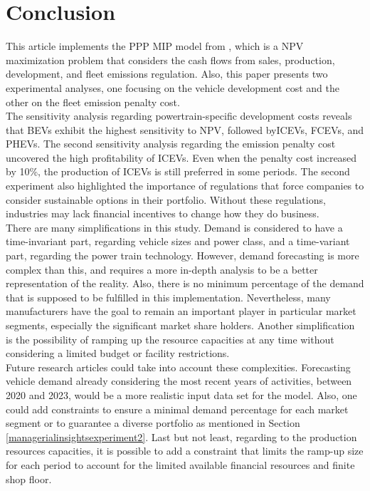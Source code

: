 \chapter{Conclusion}\label{chapter:Conclusion}
This article implements the \gls{PPP} \gls{MIP} model from \cite{mainreference_thies}, which is a \gls{NPV} maximization problem that considers the cash flows from sales, production, development, and fleet emissions regulation. Also, this paper presents two experimental analyses, one focusing on the vehicle development cost and the other on the fleet emission penalty cost.\\
The sensitivity analysis regarding powertrain-specific development costs reveals that \gls{BEV}s exhibit the highest sensitivity to \gls{NPV}, followed by\gls{ICEV}s, \gls{FCEV}s, and \gls{PHEV}s. The second sensitivity analysis regarding the emission penalty cost uncovered the high profitability of \gls{ICEV}s. Even when the penalty cost increased by 10\%, the production of \gls{ICEV}s is still preferred in some periods. The second experiment also highlighted the importance of regulations that force companies to consider sustainable options in their portfolio. Without these regulations, industries may lack financial incentives to change how they do business. \\
There are many simplifications in this study. Demand is considered to have a time-invariant part, regarding vehicle sizes and power class, and a time-variant part, regarding the power train technology. However, demand forecasting is more complex than this, and requires a more in-depth analysis to be a better representation of the reality. Also, there is no minimum percentage of the demand that is supposed to be fulfilled in this implementation. Nevertheless, many manufacturers have the goal to remain an important player in particular market segments, especially the significant market share holders. Another simplification is the possibility of ramping up the resource capacities at any time without considering a limited budget or facility restrictions.\\
Future research articles could take into account these complexities. Forecasting vehicle demand already considering the most recent years of activities, between 2020 and 2023, would be a more realistic input data set for the model. Also, one could add constraints to ensure a minimal demand percentage for each market segment or to guarantee a diverse portfolio as mentioned in Section \ref{managerialinsightsexperiment2}. Last but not least, regarding to the production resources capacities, it is possible to add a constraint that limits the ramp-up size for each period to account for the limited available financial resources and finite shop floor.\\

